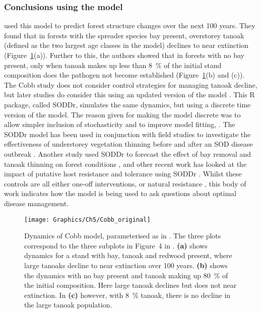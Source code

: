 \subsubsection{Conclusions using the model}

\citet{cobb_ecosystem_2012} used this model to predict forest structure changes over the next 100 years. They found that in forests with the spreader species bay present, overstorey tanoak (defined as the two largest age classes in the model) declines to near extinction (Figure~\ref{fig:ch5:cobb_host_change}(a)). Further to this, the authors showed that in forests with no bay present, only when tanoak makes up less than \SI{8}{\percent} of the initial stand composition does the pathogen not become established (Figure~\ref{fig:ch5:cobb_host_change}(b) and (c)). The Cobb study does not consider control strategies for managing tanoak decline, but later studies do consider this using an updated version of the model \citep{ross_soddr_2013}. This R package, called SODDr, simulates the same dynamics, but using a discrete time version of the model. The reason given for making the model discrete was to allow simpler inclusion of stochasticity and to improve model fitting, . The SODDr model has been used in conjunction with field studies to investigate the effectiveness of understorey vegetation thinning before and after an SOD disease outbreak \citep{cobb_resiliency_2017}. Another study used SODDr to forecast the effect of bay removal and tanoak thinning on forest conditions \citep{valachovic_forest_2017}, and other recent work has looked at the impact of putative host resistance and tolerance using SODDr \citep{cobb_promise_2019}. Whilst these controls are all either one-off interventions, or natural resistance , this body of work indicates how the model is being used to ask questions about optimal disease management.

\begin{figure}
    \begin{center}
        \texttt{[image: Graphics/Ch5/Cobb\_original]}
        \caption[Mixed stand model baseline dynamics]{Dynamics of Cobb model, parameterised as in \citet{cobb_ecosystem_2012}. The three plots correspond to the three subplots in Figure~4 in \citet{cobb_ecosystem_2012}. \textbf{(a)} shows dynamics for a stand with bay, tanoak and redwood present, where large tanoaks decline to near extinction over 100 years. \textbf{(b)} shows the dynamics with no bay present and tanoak making up \SI{80}{\percent} of the initial composition. Here large tanoak declines but does not near extinction. In \textbf{(c)} however, with \SI{8}{\percent} tanoak, there is no decline in the large tanoak population.\label{fig:ch5:cobb_host_change}}
    \end{center}
\end{figure}

